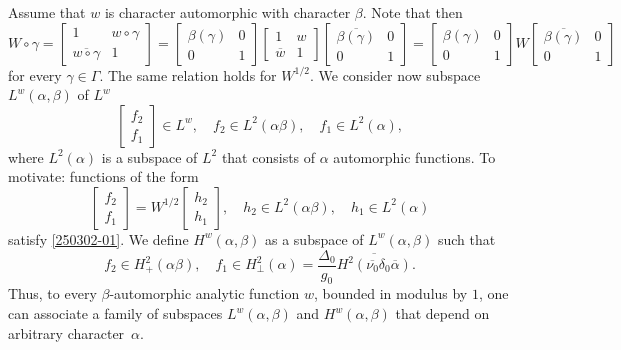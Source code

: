 \documentclass[reqno,11pt,centertags]{article}
\theoremstyle{definition}
\def\be{\begin{equation}}
\def\ee{\end{equation}}
\def\a{\alpha}
\def\b{\beta}
\def\d{\delta}
\def\D{\Delta}
\def\g{\gamma}
\def\G{\Gamma}
\begin{document}
Assume that $w$ is character automorphic with character $\beta$. Note that then
$$
W\circ\gamma=
\begin{bmatrix}
1 & w\circ\gamma \\
\overline{w\circ\gamma} & 1
\end{bmatrix}
=
\begin{bmatrix}
\beta(\gamma) & 0 \\
0 & 1
\end{bmatrix}
\begin{bmatrix}
1 & w \\
\overline{w} & 1
\end{bmatrix}
\begin{bmatrix}
\overline{\beta(\gamma)} & 0
\\
0 & 1
\end{bmatrix}
=
\begin{bmatrix}
\beta(\gamma) & 0 \\
0 & 1
\end{bmatrix}
W
\begin{bmatrix}
\overline{\beta(\gamma)} & 0
\\
0 & 1
\end{bmatrix}
$$
for every $\g\in\G$.
The same relation holds for $W^{1/2}$. We consider now subspace $L^w(\alpha, \beta)$ of $L^w$
\be\label{250302-01}
\begin{bmatrix} f_2 \\ f_1 \end{bmatrix}\in L^w,\quad f_2\in L^2(\alpha\beta), \quad f_1\in L^2(\alpha),
\ee
where $L^2(\alpha)$ is a subspace of $L^2$ that consists of $\a$ automorphic functions.
To motivate: functions of the form
$$
\begin{bmatrix} f_2 \\ f_1 \end{bmatrix}=
W^{1/2}\begin{bmatrix} h_2 \\ h_1 \end{bmatrix},\quad h_2\in L^2(\alpha\beta), \quad h_1\in L^2(\alpha)
$$
satisfy \eqref{250302-01}. We define $H^w(\alpha, \beta)$ as a subspace of $L^w(\alpha, \beta)$ such that
$$
f_2\in H^2_+(\alpha\beta),\quad f_1\in H^2_\perp(\alpha)=
\dfrac{\D_0}{g_0}\overline{H^2(\overline{\nu_0}\d_0\overline\alpha)}
.
$$
Thus, to every $\b$-automorphic analytic function $w$, bounded in modulus by $1$,
one can associate a family of subspaces $L^w(\a,\b)$ and $H^w(\a,\b)$ that depend on
arbitrary character~$\a$.
\end{document}
